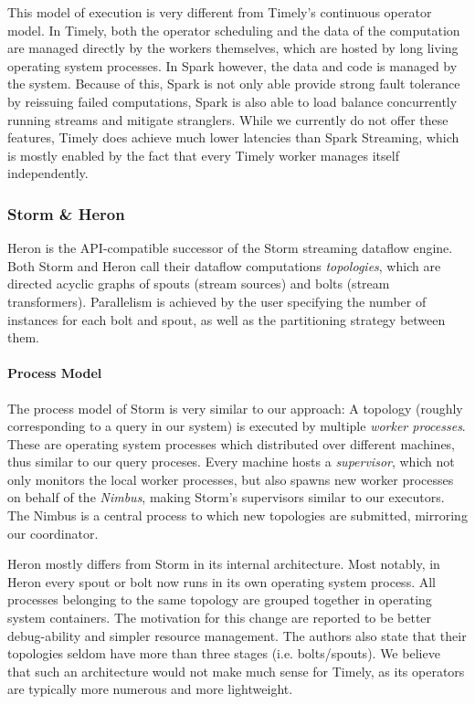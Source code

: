 This model of execution is very different from Timely's continuous operator
model. In Timely, both the operator scheduling and the data of the
computation are managed directly by the workers themselves, which are hosted
by long living operating system processes. In Spark however, the data and code
is managed by the system. Because of this, Spark is not only able provide strong
fault tolerance by reissuing failed computations, Spark is also able to load
balance concurrently running streams and mitigate stranglers. While we currently
do not offer these features, Timely does achieve much lower latencies than
Spark Streaming, which is mostly enabled by the fact that every Timely
worker manages itself independently.


\subsubsection{Storm \& Heron}

Heron \cite{heron} is the API-compatible successor of the Storm \cite{storm}
streaming dataflow engine.
Both Storm and Heron call their dataflow computations \emph{topologies}, which 
are directed acyclic graphs of spouts (stream sources) and bolts
(stream transformers). Parallelism is achieved by the user specifying the
number of instances for each bolt and spout, as well as the partitioning
strategy between them.

\paragraph{Process Model}

The process model of Storm is very similar to our approach: A topology
(roughly corresponding to a query in our system) is executed by multiple
\emph{worker processes}. These are operating system processes which distributed
over different machines, thus similar to our query proceses. Every machine hosts
a \emph{supervisor}, which not only monitors the local worker processes, but also spawns new worker
processes on behalf of the \emph{Nimbus}, making Storm's supervisors similar to our executors.
The Nimbus is a central process to which new topologies are submitted, mirroring our coordinator.

Heron mostly differs from Storm in its internal architecture. Most notably, in
Heron every spout or bolt now runs in its own operating system process. All processes
belonging to the same topology are grouped together in operating system containers.
The motivation for this change are reported to be better debug-ability
and simpler resource management. The authors also state that their topologies
seldom have more than three stages (i.e. bolts/spouts). We believe that such
an architecture would not make much sense for Timely, as its operators are typically
more numerous and more lightweight.

